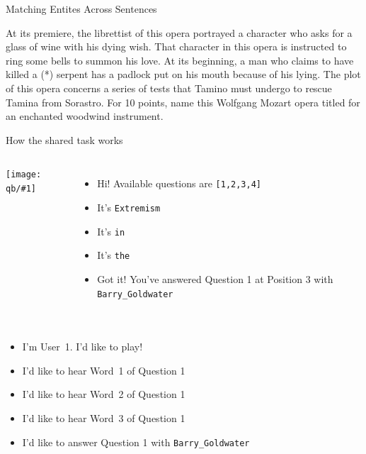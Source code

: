 \documentclass[xcolor=dvipsnames]{beamer}
\newcommand{\gfxq}[2]{
\begin{center}
	\texttt{[image: qb/\#1]}
\end{center}
}
\begin{document}
\begin{frame}{Matching Entites Across Sentences}

\begin{block}{}

    At its premiere, \alert<3>{the librettist of this opera} portrayed
    \alert<4>{a character who asks for a glass of wine with his dying wish}. \alert<4>{That
    character} in this opera is instructed to ring some bells to summon
    his love. At its beginning, \alert<5>{a man} who claims to have killed a (*)
    serpent has a padlock put on \alert<5>{his} mouth because of \alert<5>{his} lying. The
    plot of this opera concerns a series of tests that \alert<5>{Tamino} must
    undergo to rescue Tamina from Sorastro. For 10 points, name this
    Wolfgang Mozart opera titled for \alert<6>{an enchanted woodwind instrument}.
\end{block}



\end{frame}




\begin{frame}{How the shared task works}

\begin{columns}
  \gfxq{bamber}{.8}

  \begin{itemize}
    \item<3-> Hi! Available questions are \texttt{[1,2,3,4]}
    \item<5-> It's \texttt{Extremism}
    \item<7-> It's \texttt{in}
    \item<9-> It's \texttt{the}
    \item<11-> Got it!  You've answered Question 1 at Position
      3 with \texttt{Barry\_Goldwater}
  \end{itemize}

\end{columns}


\begin{columns}

  \begin{itemize}
    \item<2-> I'm User~1.  I’d like to play!
    \item<4-> I’d like to hear Word~1 of Question 1
    \item<6-> I’d like to hear Word~2 of Question 1
    \item<8-> I’d like to hear Word~3 of Question 1
    \item<10-> I’d like to answer Question 1 with
      \texttt{Barry\_Goldwater}
    \end{itemize}
  \only<2->{\gfxq{buzzer}{.5}}
\end{columns}

\end{frame}
\end{document}
